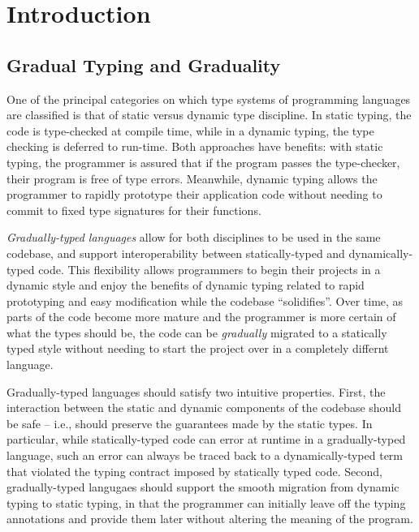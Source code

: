 \section{Introduction}
  
\subsection{Gradual Typing and Graduality}
One of the principal categories on which type systems of programming languages are classified
is that of static versus dynamic type discipline.
In static typing, the code is type-checked at compile time, while in a dynamic typing,
the type checking is deferred to run-time. Both approaches have benefits: with static typing,
the programmer is assured that if the program passes the type-checker, their program
is free of type errors. Meanwhile, dynamic typing allows the programmer to rapidly prototype
their application code without needing to commit to fixed type signatures for their functions.

\emph{Gradually-typed languages} \cite{siek-taha06} allow for both disciplines
to be used in the same codebase, and support interoperability between statically-typed
and dynamically-typed code.
This flexibility allows programmers to begin their projects in a dynamic style and
enjoy the benefits of dynamic typing related to rapid prototyping and easy modification
while the codebase ``solidifies''. Over time, as parts of the code become more mature
and the programmer is more certain of what the types should be, the code can be
\emph{gradually} migrated to a statically typed style without needing to start the project
over in a completely differnt language.

Gradually-typed languages should satisfy two intuitive properties.
First, the interaction between the static and dynamic components of the codebase
should be safe -- i.e., should preserve the guarantees made by the static types.
In particular, while statically-typed code can error at runtime in a gradually-typed language,
such an error can always be traced back to a dynamically-typed term that
violated the typing contract imposed by statically typed code.
Second, gradually-typed langugaes should support the smooth migration from dynamic typing
to static typing, in that the programmer can initially leave off the
typing annotations and provide them later without altering the meaning of the
program.

